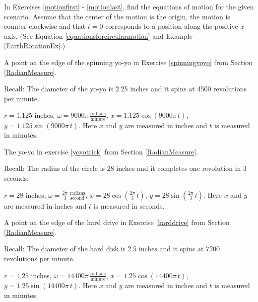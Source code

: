 \documentclass{ximera}
\begin{document}
\begin{question}
    In Exercises \ref{motionfirst} - \ref{motionlast}, find the equations of motion for the given scenario.  Assume that the center of the motion is the origin, the motion is counter-clockwise and that $t = 0$ corresponds to a position along the positive $x$-axis.  (See Equation \ref{equationsforcircularmotion} and Example \ref{EarthRotationEx}.)

\begin{problem}\label{motionfirst} 
    A point on the edge of the spinning yo-yo in Exercise \ref{spinningyoyo} from Section \ref{RadianMeasure}. 

Recall: The diameter of the yo-yo is 2.25 inches and it spins at 4500 revolutions per minute.

\begin{solution}

$r = 1.125$ inches, $\omega = 9000 \pi \, \frac{\text{radians}}{\text{minute}}$,  $x = 1.125 \cos(9000 \pi \, t)$, $y = 1.125 \sin(9000 \pi \, t)$.  Here $x$ and $y$ are measured in inches and $t$ is measured in minutes.

\end{solution}
\end{problem}

\begin{problem}
     The yo-yo in exercise \ref{yoyotrick} from Section \ref{RadianMeasure}.

Recall: The radius of the circle is 28 inches and it completes one revolution in 3 seconds.

\begin{solution}
 $r = 28$ inches, $\omega = \frac{2\pi}{3} \, \frac{\text{radians}}{\text{second}}$,  $x = 28 \cos\left(\frac{2\pi}{3} \, t \right)$, $y = 28 \sin\left(\frac{2\pi}{3} \, t \right)$.  Here $x$ and $y$ are measured in inches and $t$ is measured in seconds.
\end{solution}
\end{problem}

\begin{problem}
    A point on the edge of the hard drive in Exercise \ref{harddrive} from Section \ref{RadianMeasure}.

Recall:  The diameter of the hard disk is 2.5 inches and it spins at 7200 revolutions per minute.

\begin{solution}

$r = 1.25$ inches, $\omega = 14400 \pi \, \frac{\text{radians}}{\text{minute}}$,  $x = 1.25 \cos(14400 \pi \, t)$, $y = 1.25 \sin(14400 \pi \, t)$.  Here $x$ and $y$ are measured in inches and $t$ is measured in minutes.


\end{solution}
\end{problem}
\end{question}
\end{document}
